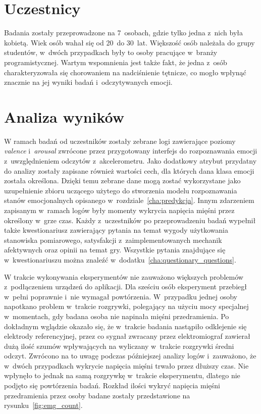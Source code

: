 \section{Uczestnicy}
Badania zostały przeprowadzone na 7~osobach, gdzie tylko jedna z~nich była kobietą. Wiek osób wahał się od 20~do 30~lat. Większość osób należała do grupy studentów, w~dwóch przypadkach były to osoby pracujące w~branży programistycznej. Wartym wspomnienia jest także fakt, że jedna z~osób charakteryzowała się chorowaniem na nadciśnienie tętnicze, co mogło wpłynąć znacznie na jej wyniki badań i~odczytywanych emocji.
\section{Analiza wyników}
W ramach badań od uczestników zostały zebrane logi zawierające poziomy \textit{valence} i~\textit{arousal} zwrócone przez przygotowany interfejs do rozpoznawania emocji z~uwzględnieniem odczytów z~akcelerometru. Jako dodatkowy atrybut przydatny do analizy zostały zapisane również wartości cech, dla których dana klasa emocji została określona. Dzięki temu zebrane dane mogą zostać wykorzystane jako uzupełnienie zbioru uczącego użytego do stworzenia modelu rozpoznawania stanów emocjonalnych opisanego w~rozdziale~\ref{cha:predykcja}. Innym zdarzeniem zapisanym w~ramach logów były momenty wykrycia napięcia mięśni przez określony w~grze czas. Każdy z~uczestników po przeprowadzeniu badań wypełnił także kwestionariusz zawierający pytania na temat wygody użytkowania stanowiska pomiarowego, satysfakcji z~zaimplementowanych mechanik afektywnych oraz opinii na temat gry. Wszystkie pytania znajdujące się w~kwestionariuszu można znaleźć w~dodatku~\ref{cha:questionary_questions}.

W trakcie wykonywania eksperymentów nie zauważono większych problemów z~podłączeniem urządzeń do aplikacji. Dla sześciu osób eksperyment przebiegł w~pełni poprawnie i~nie wymagał powtórzenia. W~przypadku jednej osoby napotkano problem w~trakcie rozgrywki, polegający na użyciu mocy specjalnej w~momentach, gdy badana osoba nie napinała mięśni przedramienia. Po dokładnym wglądzie okazało się, że w~trakcie badania nastąpiło odklejenie się elektrody referencyjnej, przez co sygnał zwracany przez elektromiograf zawierał dużą ilość szumów wpływających na wyliczany w~trakcie rozgrywki średni odczyt. Zwrócono na to uwagę podczas późniejszej analizy logów i~zauważono, że w~dwóch przypadkach wykrycie napięcia mięśni trwało przez dłuższy czas. Nie wpłynęło to jednak na samą rozgrywkę w~trakcie eksperymentu, dlatego nie podjęto się powtórzenia badań. Rozkład ilości wykryć napięcia mięśni przedramienia przez osoby badane zostały przedstawione na rysunku~\ref{fig:emg_count}.

